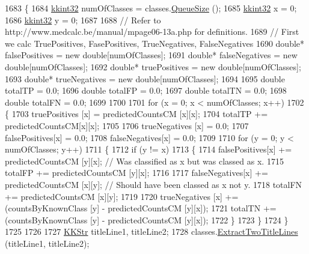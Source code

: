 \begin{DoxyCode}
1683 \{
1684   \hyperlink{namespace_k_k_b_a8fa4952cc84fda1de4bec1fbdd8d5b1b}{kkint32}  numOfClasses = classes.\hyperlink{class_k_k_b_1_1_k_k_queue_a1dab601f75ee6a65d97f02bddf71c40d}{QueueSize} ();
1685   \hyperlink{namespace_k_k_b_a8fa4952cc84fda1de4bec1fbdd8d5b1b}{kkint32}  x = 0;
1686   \hyperlink{namespace_k_k_b_a8fa4952cc84fda1de4bec1fbdd8d5b1b}{kkint32}  y = 0;
1687 
1688   \textcolor{comment}{//  Refer to http://www.medcalc.be/manual/mpage06-13a.php for definitions.}
1689   \textcolor{comment}{// First we calc TruePositives, FasePositives, TrueNegatives, FalseNegatives}
1690   \textcolor{keywordtype}{double}*  falsePositives = \textcolor{keyword}{new} \textcolor{keywordtype}{double}[numOfClasses];
1691   \textcolor{keywordtype}{double}*  falseNegatives = \textcolor{keyword}{new} \textcolor{keywordtype}{double}[numOfClasses];
1692   \textcolor{keywordtype}{double}*  truePositives  = \textcolor{keyword}{new} \textcolor{keywordtype}{double}[numOfClasses];
1693   \textcolor{keywordtype}{double}*  trueNegatives  = \textcolor{keyword}{new} \textcolor{keywordtype}{double}[numOfClasses];
1694 
1695   \textcolor{keywordtype}{double}  totalTP = 0.0;
1696   \textcolor{keywordtype}{double}  totalFP = 0.0;
1697   \textcolor{keywordtype}{double}  totalTN = 0.0;
1698   \textcolor{keywordtype}{double}  totalFN = 0.0;
1699 
1700 
1701   \textcolor{keywordflow}{for}  (x = 0;  x < numOfClasses;  x++)
1702   \{
1703     truePositives [x] = predictedCountsCM [x][x];
1704     totalTP += predictedCountsCM[x][x];
1705 
1706     trueNegatives [x] = 0.0;
1707     falsePositives[x] = 0.0;
1708     falseNegatives[x] = 0.0;
1709 
1710     \textcolor{keywordflow}{for}  (y = 0;  y < numOfClasses;  y++)
1711     \{
1712       \textcolor{keywordflow}{if}  (y != x)
1713       \{
1714         falsePositives[x] += predictedCountsCM [y][x];  \textcolor{comment}{// Was classified as x but was classed as x.}
1715         totalFP           += predictedCountsCM [y][x];
1716 
1717         falseNegatives[x] += predictedCountsCM [x][y];  \textcolor{comment}{// Should have been classed as x not y.}
1718         totalFN           += predictedCountsCM [x][y];
1719 
1720         trueNegatives [x] += (countsByKnownClass [y] - predictedCountsCM [y][x]);
1721         totalTN += (countsByKnownClass [y] - predictedCountsCM [y][x]);
1722       \}
1723     \}
1724   \}
1725  
1726 
1727   \hyperlink{class_k_k_b_1_1_k_k_str}{KKStr}  titleLine1, titleLine2;
1728   classes.\hyperlink{class_k_k_m_l_l_1_1_m_l_class_list_ab36deaa540b8c1651d4424604a748dee}{ExtractTwoTitleLines} (titleLine1, titleLine2);

\end{DoxyCode}
